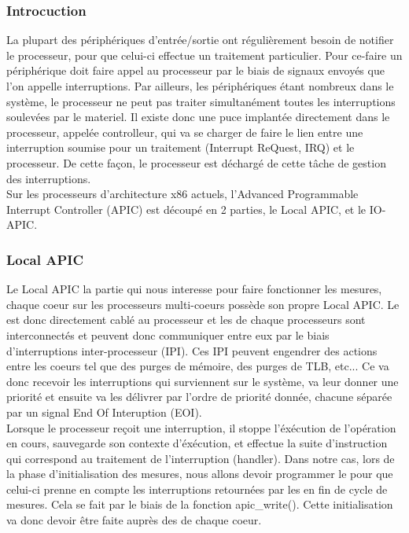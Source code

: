 					\subsubsection{Introcuction}
						La plupart des périphériques d'entrée/sortie ont régulièrement besoin de notifier le processeur, pour que celui-ci effectue un traitement particulier. Pour ce-faire un périphérique doit faire appel au processeur par le biais de signaux envoyés que l'on appelle interruptions. Par ailleurs, les périphériques étant nombreux dans le système, le processeur ne peut pas traiter simultanément toutes les interruptions soulevées par le materiel. Il existe donc une puce implantée directement dans le processeur, appelée controlleur, qui va se charger de faire le lien entre une interruption soumise pour un traitement (Interrupt ReQuest, IRQ) et le processeur. De cette façon, le processeur est déchargé de cette tâche de gestion des interruptions.\\ 
					Sur les processeurs d'architecture x86 actuels, l'Advanced Programmable Interrupt Controller (APIC) est découpé en 2 parties, le Local APIC, et le IO-APIC. 
					\subsubsection{Local APIC}
						Le Local APIC la partie qui nous interesse pour faire fonctionner les mesures, chaque coeur sur les processeurs multi-coeurs possède son propre Local APIC. Le \lap est donc directement cablé au processeur et les \lap de chaque processeurs sont interconnectés et peuvent donc communiquer entre eux par le biais d'interruptions inter-processeur (IPI). Ces IPI peuvent engendrer des actions entre les coeurs tel que des purges de mémoire, des purges de TLB, etc... Ce \lap va donc recevoir les interruptions qui surviennent sur le système, va leur donner une priorité et ensuite va les délivrer par l'ordre de priorité donnée, chacune séparée par un signal End Of Interuption (EOI). \\
					Lorsque le processeur reçoit une interruption, il stoppe l'éxécution de l'opération en cours, sauvegarde son contexte d'éxécution, et effectue la suite d'instruction qui correspond au traitement de l'interruption (handler). Dans notre cas, lors de la phase d'initialisation des mesures, nous allons devoir programmer le \lap pour que celui-ci prenne en compte les interruptions retournées par les \IBS en fin de cycle de mesures. Cela se fait par le biais de la fonction apic\_write(). Cette initialisation va donc devoir être faite auprès des \lap de chaque coeur.\\
